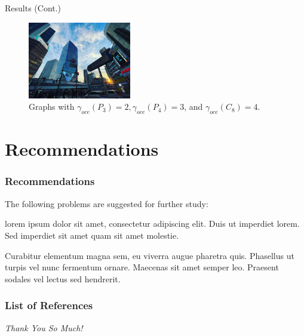 \documentclass[11pt, fontset=windows, ignorenonframetext]{beamer}  %
\numberwithin{subsection}{section}
\numberwithin{theorem}{subsection}
\begin{document}
	\begin{frame}{Results (Cont.)}
		\begin{figure}[ht]
		\centering
		\includegraphics[width=0.4\textwidth, height=0.6\textheight]{./Figure/arata_1.jpg}
		\caption{Graphs with $\gamma_{oce}(P_{3})=2, \gamma_{oce}(P_{4})=3$, and $\gamma_{oce}(C_{8})=4$.\label{F2}}
		\end{figure} 
	\end{frame}

\section{Recommendations}
	\begin{frame}
		\frametitle{Recommendations}
		\justifying
		The following problems are suggested for further study:

		\citet{velickovic2017graph} lorem ipsum dolor sit amet, consectetur adipiscing elit. Duis ut imperdiet lorem. Sed imperdiet sit amet quam sit amet molestie. 
		
		Curabitur elementum magna sem, eu viverra augue pharetra quis. Phasellus ut turpis vel nunc fermentum ornare. Maecenas sit amet semper leo. Praesent sodales vel lectus sed hendrerit.
		\citep{kosaraju2019social,velickovic2017graph}
	\end{frame}

	\begin{frame}[allowframebreaks]
		\justifying
		\frametitle{List of References}
		\printbibliography
	\end{frame}

	\begin{frame}
		\centering
		\begin{block}
			\scshape
				\begin{center}
					\Huge\emph{Thank You So Much!}
				\end{center}
		\end{block}
	\end{frame}
\end{document}
